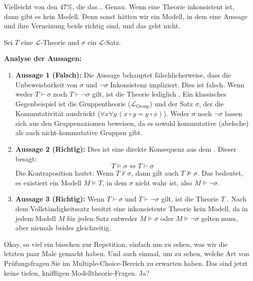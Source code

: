 \begin{spoken-clean}[00:04:12 - 00:04:27]
Vielleicht von den 47\%, die das... Genau. Wenn eine Theorie inkonsistent ist, dann gibt es kein Modell. Denn sonst hätten wir ein Modell, in dem eine Aussage und ihre Verneinung beide richtig sind, und das geht nicht.
\end{spoken-clean}

\begin{math-stroke}
Sei $T$ eine $\mathcal{L}$-Theorie und $\sigma$ ein $\mathcal{L}$-Satz.

\textbf{Analyse der Aussagen:}
\begin{enumerate}[label=\textbf{(\arabic*)}]
    \item \textbf{Aussage 1 (Falsch):} Die Aussage behauptet fälschlicherweise, dass die Unbeweisbarkeit von $\sigma$ und $\neg\sigma$ Inkonsistenz impliziert. 
    Dies ist falsch. Wenn weder $T \vdash \sigma$ noch $T \vdash \neg\sigma$ gilt, ist die Theorie lediglich . Ein klassisches Gegenbeispiel ist die Gruppentheorie ($\mathcal{L}_{\text{Group}}$) und der Satz $\sigma$, der die Kommutativität ausdrückt ($\forall x \forall y \, (x \circ y = y \circ x)$). Weder $\sigma$ noch $\neg\sigma$ lassen sich aus den Gruppenaxiomen beweisen, da es sowohl kommutative (abelsche) als auch nicht-kommutative Gruppen gibt.
    
    \item \textbf{Aussage 2 (Richtig):} Dies ist eine direkte Konsequenz aus dem . Dieser besagt:
    \[
    T \models \sigma \iff T \vdash \sigma
    \]
    Die Kontraposition lautet: Wenn $T \not\vdash \sigma$, dann gilt auch $T \not\models \sigma$. Das bedeutet, es existiert ein Modell $M \models T$, in dem $\sigma$ nicht wahr ist, also $M \models \neg\sigma$.
    
    \item \textbf{Aussage 3 (Richtig):} Wenn $T \vdash \sigma$ und $T \vdash \neg\sigma$ gilt, ist die Theorie $T$ . Nach dem Vollständigkeitssatz besitzt eine inkonsistente Theorie kein Modell, da in jedem Modell $M$ für jeden Satz entweder $M \models \sigma$ oder $M \models \neg\sigma$ gelten muss, aber niemals beides gleichzeitig.
\end{enumerate}
\end{math-stroke}

\begin{spoken-clean}[00:04:27 - 00:06:36]
Okay, so viel ein bisschen zur Repetition, einfach um zu sehen, was wir die letzten paar Male gemacht haben. Und auch einmal, um zu sehen, welche Art von Prüfungsfragen Sie im Multiple-Choice-Bereich zu erwarten haben. Das sind jetzt keine tiefen, kniffligen Modelltheorie-Fragen. Ja?
\end{spoken-clean}

